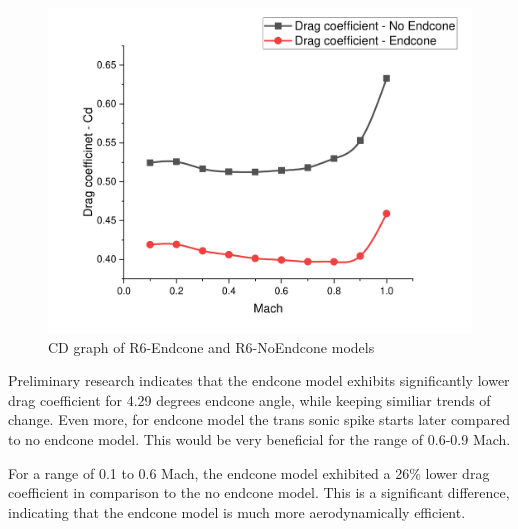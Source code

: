 \documentclass{article}
\begin{document}
\begin{figure}[H]
    \centering
    \includegraphics[width=\textwidth]{../data/DataAnalisysSolid/Solid-Studies-CD-Graph.pdf}
    \caption{CD graph of R6-Endcone and R6-NoEndcone models}
\end{figure}
Preliminary research indicates that the endcone model exhibits significantly lower drag coefficient
for 4.29 degrees endcone angle, while keeping similiar trends of change. Even more, for endcone model
the trans sonic spike starts later compared to no endcone model. This would be very beneficial for the
range of 0.6-0.9 Mach.  
\begin{table}[H]
    \centering
    \caption{Average values and differences}
\end{table}
For a range of 0.1 to 0.6 Mach, the endcone model exhibited a 26\% lower drag coefficient in 
comparison to the no endcone model. This is a significant difference, indicating that the endcone
model is much more aerodynamically efficient.
\newpage
\end{document}
